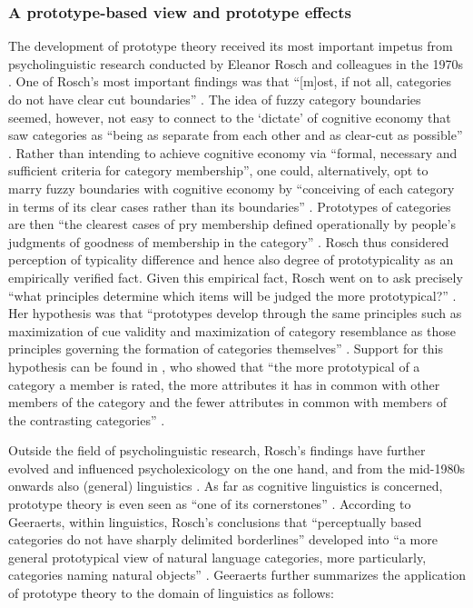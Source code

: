 \subsubsection{A prototype-based view and prototype effects}
\label{sec:2.4.3.1}  
The development of prototype theory received its most important impetus from psycholinguistic research conducted by Eleanor Rosch and colleagues in the 1970s \citep{rosch_cognitive_1975,rosch_family_1975,Rosch1978,margolis_principles_1999}. One of Rosch’s most important findings was that “[m]ost, if not all, categories do not have clear cut boundaries” \citep[196]{margolis_principles_1999}. The idea of fuzzy category boundaries seemed, however, not easy to connect to the ‘dictate’ of cognitive economy that saw categories as “being as separate from each other and as clear-cut as possible” \citep[196]{margolis_principles_1999}. Rather than intending to achieve cognitive economy via “formal, necessary and sufficient criteria for category membership”, one could, alternatively, opt to marry fuzzy boundaries with cognitive economy by “conceiving of each category in terms of its clear cases rather than its boundaries” \citep[196]{margolis_principles_1999}. Prototypes of categories are then “the clearest cases of pry membership defined operationally by people’s judgments of goodness of membership in the category” \citep{margolis_principles_1999}. Rosch thus considered perception of typicality difference and hence also degree of prototypicality as an empirically verified fact. Given this empirical fact, Rosch went on to ask precisely “what principles determine which items will be judged the more prototypical?” \citep[197]{margolis_principles_1999}. Her hypothesis was that “prototypes develop through the same principles such as maximization of cue validity and maximization of category resemblance as those principles governing the formation of categories themselves” \citep{margolis_principles_1999}. Support for this hypothesis can be found in \citet{rosch_family_1975}, who showed that “the more prototypical of a category a member is rated, the more attributes it has in common with other members of the category and the fewer attributes in common with members of the contrasting categories” \citep[197]{margolis_principles_1999}.

Outside the field of psycholinguistic research, Rosch’s findings have further evolved and influenced psycholexicology on the one hand, and from the mid-1980s onwards also (general) linguistics \citep[578]{allan_lexical_2013}. As far as cognitive linguistics is concerned, prototype theory is even seen as “one of its cornerstones” \citep[145]{Geeraerts2006}. According to Geeraerts, within linguistics, Rosch’s conclusions that “perceptually based categories do not have sharply delimited borderlines” developed into “a more general prototypical view of natural language categories, more particularly, categories naming natural objects” \citep[578]{allan_lexical_2013}. Geeraerts further summarizes the application of prototype theory to the domain of linguistics as follows:

